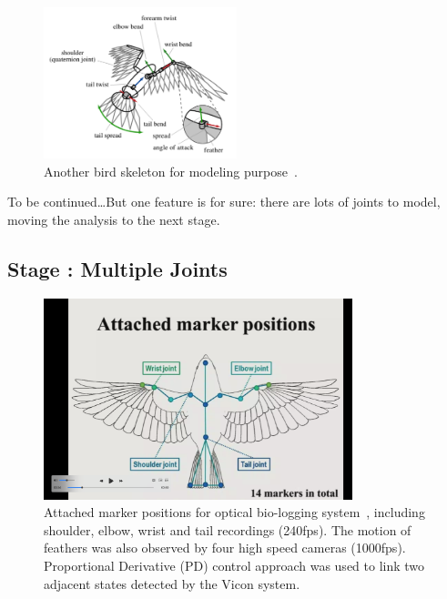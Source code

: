 \documentclass[11pt, a4paper]{article}
\newcounter{mycounter}
\begin{document}
\begin{figure}[htbp]
	\centering
	\includegraphics[width=0.5\textwidth]{
		fileForWriting/The bird skeleton}
	\caption{Another bird skeleton for modeling purpose~\cite{wu_realistic_2003}.}
	\label{fig:}
\end{figure}


To be continued\ldots But one feature is for sure:
there are lots of joints to model, moving the analysis to the next stage.

\newpage
\subsection{Stage \themycounter: Multiple Joints}
\begin{figure}[htbp]
	\centering
	\includegraphics[width=0.8\textwidth]{
		fileForWriting/Data-driven bird simulation}
	\caption{Attached marker positions for optical bio-logging system~\cite{ju_data-driven_2011}, including shoulder, elbow, wrist and tail recordings (240fps). The motion of feathers was also observed by four high speed cameras (1000fps). Proportional Derivative (PD) control approach was used to link two adjacent states detected by the Vicon system.}
	\label{fig:Data-driven Bird Simulation}
\end{figure}
\end{document}

